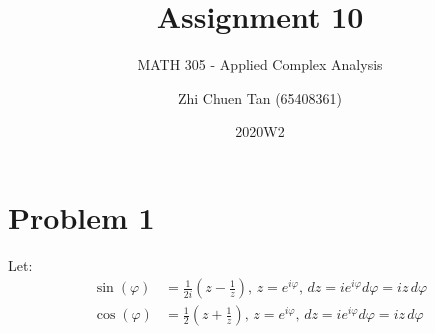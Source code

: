 \documentclass[letterpaper, titlepage, DIV=14]{scrartcl}
\title{Assignment 10}
\subtitle{MATH 305 - Applied Complex Analysis}
\author{Zhi Chuen Tan (65408361)}
\date{2020W2}
\begin{document}
    \onehalfspacing
    \hypersetup{pageanchor=false}
    \begin{titlepage}
        \maketitle
        \vfill
        
    \end{titlepage}
    \hypersetup{pageanchor=true}

    \section*{Problem 1}
    Let:
    \begin{align*}
      \sin(\varphi) &= \frac{1}{2i}(z-\frac{1}{z}), \, z = e^{i\varphi}, \, dz = ie^{i\varphi} d\varphi= iz \, d\varphi \\
      \cos(\varphi) &= \frac{1}{2}(z+\frac{1}{z}), \, z = e^{i\varphi}, \, dz = ie^{i\varphi} d\varphi= iz \, d\varphi \\
    \end{align*}
    
\end{document}
